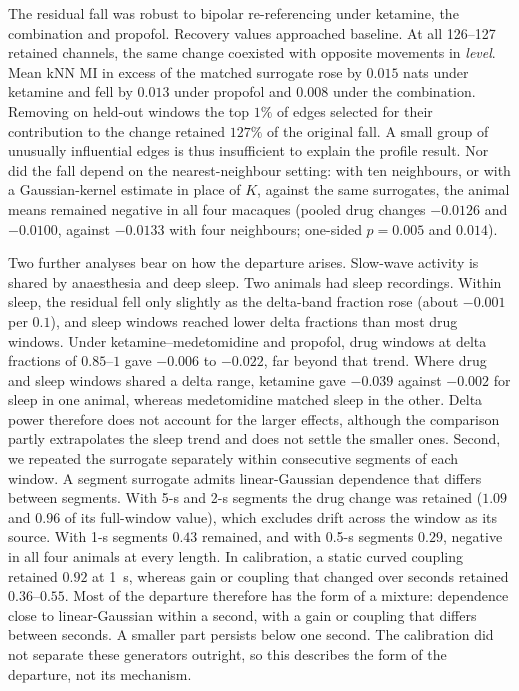 \documentclass[pdflatex,sn-nature,iicol]{sn-jnl}
\begin{document}
The residual fall was robust to bipolar re-referencing under ketamine, the combination and propofol. Recovery values approached baseline. At all 126--127 retained channels, the same change coexisted with opposite movements in \emph{level}. Mean kNN MI in excess of the matched surrogate rose by $0.015$ nats under ketamine and fell by $0.013$ under propofol and $0.008$ under the combination. Removing on held-out windows the top $1\%$ of edges selected for their contribution to the change retained $127\%$ of the original fall. A small group of unusually influential edges is thus insufficient to explain the profile result. Nor did the fall depend on the nearest-neighbour setting: with ten neighbours, or with a Gaussian-kernel estimate in place of $K$, against the same surrogates, the animal means remained negative in all four macaques (pooled drug changes $-0.0126$ and $-0.0100$, against $-0.0133$ with four neighbours; one-sided $p=0.005$ and $0.014$).

Two further analyses bear on how the departure arises. Slow-wave activity is shared by anaesthesia and deep sleep. Two animals had sleep recordings. Within sleep, the residual fell only slightly as the delta-band fraction rose (about $-0.001$ per $0.1$), and sleep windows reached lower delta fractions than most drug windows. Under ketamine--medetomidine and propofol, drug windows at delta fractions of $0.85$--$1$ gave $-0.006$ to $-0.022$, far beyond that trend. Where drug and sleep windows shared a delta range, ketamine gave $-0.039$ against $-0.002$ for sleep in one animal, whereas medetomidine matched sleep in the other. Delta power therefore does not account for the larger effects, although the comparison partly extrapolates the sleep trend and does not settle the smaller ones. Second, we repeated the surrogate separately within consecutive segments of each window. A segment surrogate admits linear-Gaussian dependence that differs between segments. With 5-s and 2-s segments the drug change was retained ($1.09$ and $0.96$ of its full-window value), which excludes drift across the window as its source. With 1-s segments $0.43$ remained, and with 0.5-s segments $0.29$, negative in all four animals at every length. In calibration, a static curved coupling retained $0.92$ at 1~s, whereas gain or coupling that changed over seconds retained $0.36$--$0.55$. Most of the departure therefore has the form of a mixture: dependence close to linear-Gaussian within a second, with a gain or coupling that differs between seconds. A smaller part persists below one second. The calibration did not separate these generators outright, so this describes the form of the departure, not its mechanism.
\end{document}

